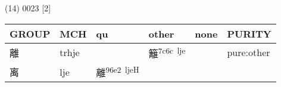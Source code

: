 \documentclass[14pt,a4paper]{scrartcl}
\begin{document}
(14) 0023 {[}2{]}

\begin{longtable}[c]{@{}llllll@{}}
\toprule
\begin{minipage}[b]{0.14\columnwidth}\raggedright\strut
GROUP
\strut\end{minipage} &
\begin{minipage}[b]{0.14\columnwidth}\raggedright\strut
MCH
\strut\end{minipage} &
\begin{minipage}[b]{0.14\columnwidth}\raggedright\strut
qu
\strut\end{minipage} &
\begin{minipage}[b]{0.14\columnwidth}\raggedright\strut
other
\strut\end{minipage} &
\begin{minipage}[b]{0.14\columnwidth}\raggedright\strut
none
\strut\end{minipage} &
\begin{minipage}[b]{0.14\columnwidth}\raggedright\strut
PURITY
\strut\end{minipage}\tabularnewline
\midrule
\endhead
\begin{minipage}[t]{0.14\columnwidth}\raggedright\strut
離
\strut\end{minipage} &
\begin{minipage}[t]{0.14\columnwidth}\raggedright\strut
trhje
\strut\end{minipage} &
\begin{minipage}[t]{0.14\columnwidth}\raggedright\strut
\strut\end{minipage} &
\begin{minipage}[t]{0.14\columnwidth}\raggedright\strut
籬\textsuperscript{7c6c~lje}
\strut\end{minipage} &
\begin{minipage}[t]{0.14\columnwidth}\raggedright\strut
\strut\end{minipage} &
\begin{minipage}[t]{0.14\columnwidth}\raggedright\strut
pure:other
\strut\end{minipage}\tabularnewline
\begin{minipage}[t]{0.14\columnwidth}\raggedright\strut
离
\strut\end{minipage} &
\begin{minipage}[t]{0.14\columnwidth}\raggedright\strut
lje
\strut\end{minipage} &
\begin{minipage}[t]{0.14\columnwidth}\raggedright\strut
離\textsuperscript{96e2~ljeH}

\end{minipage}
\end{longtable}
\end{document}
